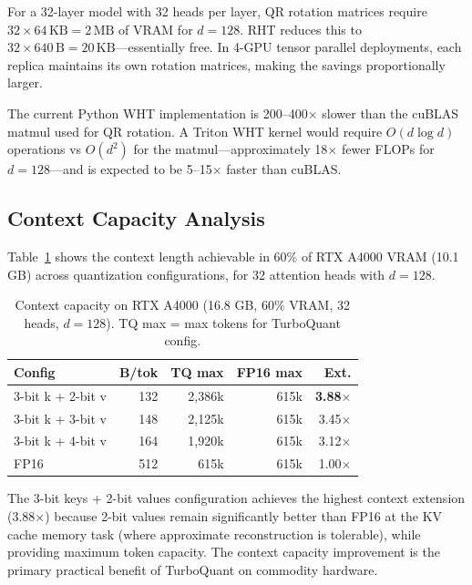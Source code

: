\documentclass[10pt,twocolumn]{article}
\begin{document}
For a 32-layer model with 32 heads per layer, QR rotation matrices require $32 \times 64\,\text{KB} = 2\,\text{MB}$ of VRAM for $d=128$. RHT reduces this to $32 \times 640\,\text{B} = 20\,\text{KB}$—essentially free. In 4-GPU tensor parallel deployments, each replica maintains its own rotation matrices, making the savings proportionally larger.

The current Python WHT implementation is 200--400$\times$ slower than the cuBLAS matmul used for QR rotation. A Triton WHT kernel would require $O(d \log d)$ operations vs $O(d^2)$ for the matmul—approximately 18$\times$ fewer FLOPs for $d = 128$—and is expected to be 5--15$\times$ faster than cuBLAS.

\subsection{Context Capacity Analysis}
\label{sec:capacity}

Table~\ref{tab:capacity} shows the context length achievable in 60\% of RTX A4000 VRAM (10.1 GB) across quantization configurations, for 32 attention heads with $d = 128$.

\begin{table}[ht]
\centering
\caption{Context capacity on RTX A4000 (16.8 GB, 60\% VRAM, 32 heads, $d=128$). TQ max = max tokens for TurboQuant config.}
\label{tab:capacity}
\begin{tabular}{lrrrr}
\toprule
\textbf{Config} & \textbf{B/tok} & \textbf{TQ max} & \textbf{FP16 max} & \textbf{Ext.} \\
\midrule
3-bit k + 2-bit v & 132 & 2,386k & 615k & \textbf{3.88$\times$} \\
3-bit k + 3-bit v & 148 & 2,125k & 615k & 3.45$\times$ \\
3-bit k + 4-bit v & 164 & 1,920k & 615k & 3.12$\times$ \\
FP16              & 512 & 615k   & 615k & 1.00$\times$ \\
\bottomrule
\end{tabular}
\end{table}

The 3-bit keys + 2-bit values configuration achieves the highest context extension (3.88$\times$) because 2-bit values remain significantly better than FP16 at the KV cache memory task (where approximate reconstruction is tolerable), while providing maximum token capacity. The context capacity improvement is the primary practical benefit of TurboQuant on commodity hardware.
\end{document}
